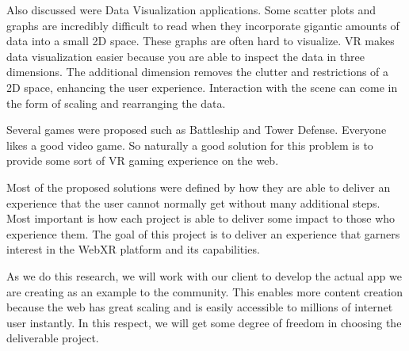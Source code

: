 Also discussed were Data Visualization applications. Some scatter plots and graphs are incredibly difficult to read when they incorporate gigantic amounts of data into a small 2D space. These graphs are often hard to visualize. VR makes data visualization easier because you are able to inspect the data in three dimensions. The additional dimension removes the clutter and restrictions of a 2D space, enhancing the user experience. Interaction with the scene can come in the form of scaling and rearranging the data.

Several games were proposed such as Battleship and Tower Defense. Everyone likes a good video game. So naturally a good solution for this problem is to provide some sort of VR gaming experience on the web.

Most of the proposed solutions were defined by how they are able to deliver an experience that the user cannot normally get without many additional steps. Most important is how each project is able to deliver some impact to those who experience them. The goal of this project is to deliver an experience that garners interest in the WebXR platform and its capabilities.

As we do this research, we will work with our client to develop the actual app we are creating as an example to the community. This enables more content creation because the web has great scaling and is easily accessible to millions of internet user instantly. In this respect, we will get some degree of freedom in choosing the deliverable project. 
